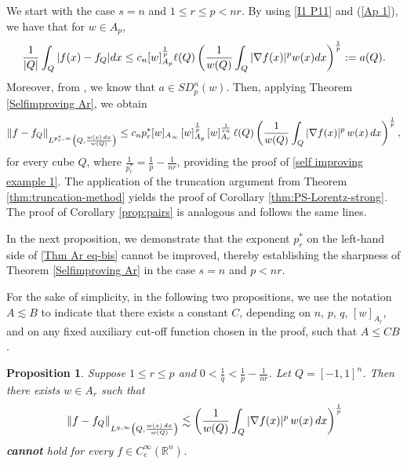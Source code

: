 \documentclass[reqno, 10pt, oneside]{amsart}
\numberwithin{equation}{section}
\newcommand{\strt}[1]{\rule{0pt}{#1}}
\newtheorem{proposition}[theorem]{Proposition}
\numberwithin{theorem}{section}
\newcommand{\R}{{\mathbb R}}
\newcommand{\norm}[1]{\left\|#1\right\|}
\newcommand{\1}{{\rm 1\hspace*{-0.4ex}%
\rule{0.1ex}{1.52ex}\hspace*{0.2ex}}}
\begin{document}
We start with the case $s=n$ and $1\le r\le p< n r$. By using \eqref{I1 P11} and (\ref{Ap 1}), we have that for $w \in A_p$,
\begin{equation}{\label{weight 1,1 Poincare inequality}}
\frac{1}{|Q|}\int_Q |f(x)-f_Q|dx \le c_n [w]_{A_p}^\frac{1}{p} \ell(Q)\left(\frac{1}{w(Q)}\int_{Q}|\nabla f(x)|^p w(x) dx\right)^{\frac{1}{p}}:=a(Q).
\end{equation}
Moreover, from \cite[Lemma 3.2]{PR}, we know that $a \in SD_p^{n}(w)$. Then, applying Theorem {\ref{Selfimproving Ar}}, we obtain
%
\begin{equation} \label{Thm Ar eq-bis}
	\norm{f-f_Q}_{\strt{2.3ex}L^{p_r^{*},\infty}\left(Q, \frac{w(x)\,dx}{w(Q)}\right)} \le c_n p^*_r [w]_{A_\infty}\,[w]_{A_p}^{\frac{1}{p}}\,[w]_{A_r}^{\frac{1}{rn}}\, \ell(Q) \left( \frac{1}{w(Q)}\int_{Q}|\nabla f(x)|^p\, w(x)\,dx\right)^{\frac{1}{p}},
\end{equation}
%
for every cube $Q$, where $\frac{1}{p_r^{*}} = \frac{1}{p} - \frac{1}{nr}$, providing the proof of \eqref{self improving example 1}. 
%
The application of the truncation argument from Theorem \ref{thm:truncation-method} yields the proof of Corollary \ref{thm:PS-Lorentz-strong}. The proof of Corollary \ref{prop:pairs} is analogous and follows the same lines.  


%
In the next proposition, we demonstrate that the exponent $p_r^{*}$ on the left-hand side of \eqref{Thm Ar eq-bis} cannot be improved, thereby establishing the sharpness of Theorem \ref{Selfimproving Ar} in the case $s=n$ and $p<nr$. 

For the sake of simplicity, in the following two propositions, we use the notation $A \lesssim B$ to indicate that there exists a constant $C$, depending on $n$, $p$, $q$, $[w]_{A_r}$, and on any fixed auxiliary cut-off function chosen in the proof, such that $A \le CB$.


\begin{proposition}{\label{counterexample proposition}} 
Suppose $1\le r\le p$ and $0<\frac{1}{q}<\frac{1}{p}-\frac{1}{nr}$. Let $Q=[-1,1]^n$. Then there exists $w \in A_r$ such that 
\begin{equation}{\label{counterexample}}
\norm{f-f_Q}_{\strt{2.3ex}L^{q,\infty}\left(Q, \frac{w(x)\, dx}{w(Q)}\right)} \lesssim \left( \frac{1}{w(Q)}\int_{Q}|\nabla f(x)|^p\, w(x)\,dx\right)^{\frac{1}{p}}    
\end{equation}
 {\bf cannot} hold for every $f \in C_c^{\infty}(\R^n)$.
\end{proposition}
\end{document}

